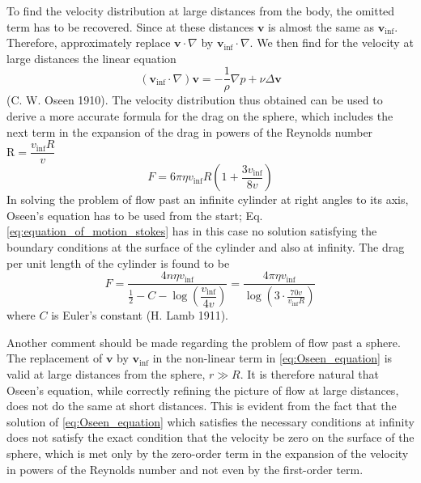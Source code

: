 \documentclass[conference]{IEEEtran}
\theoremstyle{definition}
\theoremstyle{remark}
\begin{document}
    To find the velocity distribution at large distances from the body, the omitted term has to be recovered. Since at these distances $\mathbf{v}$ is almost the same as $\mathbf{v}_\mathrm{inf}$. Therefore, approximately replace $\mathbf{v} \cdot \nabla$ by $\mathbf{v}_\mathrm{inf} \cdot \nabla$. We then find for the velocity at large distances the linear equation
    \begin{equation}
        (\mathbf{v}_\mathrm{inf} \cdot \nabla) \mathbf{v} = -\dfrac1\rho \nabla p + \nu \Delta \mathbf{v}
        \label{eq:Oseen_equation}
    \end{equation}
    (C. W. Oseen 1910). The velocity distribution thus obtained can be used to derive a more accurate formula for the drag on the sphere, which includes the next term in the expansion of the drag in powers of the Reynolds number $\mathrm{R} = \dfrac{v_\mathrm{inf}R}{v}$
    \begin{equation}
        F = 6\pi \eta v_\mathrm{inf} R (1 + \dfrac{3v_\mathrm{inf}}{8 v})
        \label{eq:drag_per_unit_length_on_cylinder}
    \end{equation}
    In solving the problem of flow past an infinite cylinder at right angles to its axis, Oseen's equation has to be used from the start; Eq. \ref{eq:equation_of_motion_stokes} has in this case no solution satisfying the boundary conditions at the surface of the cylinder and also at infinity. The drag per unit length of the cylinder is found to be
    \begin{equation}
        F = \dfrac{4n\eta v_\mathrm{inf}}{\frac12 - C - \log(\dfrac{v_\mathrm{inf}}{4v})} = \dfrac{4\pi \eta v_\mathrm{inf}}{\log(3 \cdot \frac{70v}{v_\mathrm{inf}R})}
    \end{equation}
    where $C$ is Euler's constant (H. Lamb 1911).

    Another comment should be made regarding the problem of flow past a sphere. The replacement of $\mathbf{v}$ by $\mathbf{v}_\mathrm{inf}$ in the non-linear term in \ref{eq:Oseen_equation} is valid at large distances from the sphere, $r \gg R$. It is therefore natural that Oseen's equation, while correctly refining the picture of flow at large distances, does not do the same at short distances. This is evident from the fact that the solution of \ref{eq:Oseen_equation} which satisfies the necessary conditions at infinity does not satisfy the exact condition that the velocity be zero on the surface of the sphere, which is met only by the zero-order term in the expansion of the velocity in powers of the Reynolds number and not even by the first-order term.
\end{document}
